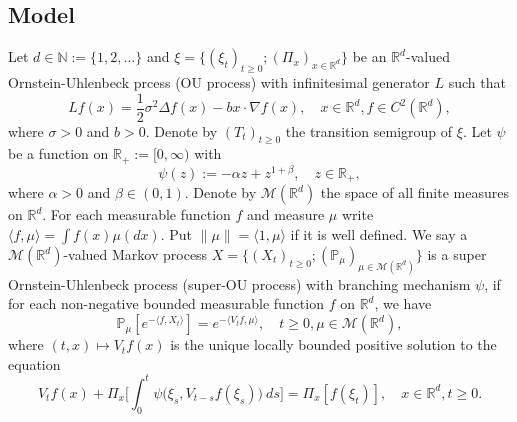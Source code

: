 \documentclass[12pt,oneside,english]{amsart}
\theoremstyle{plain}
\theoremstyle{definition}
\numberwithin{equation}{section}
\begin{document}
\subsection{Model}
    Let $d \in \mathbb N:= \{1,2,\dots\}$ and
    $\xi=\{(\xi_t)_{t\geq 0}; (\Pi_x)_{x\in \mathbb R^d}\}$ be an $\mathbb R^d$-valued Ornstein-Uhlenbeck prcess (OU process) with infinitesimal generator $L$ such that
\begin{equation}
\label{eq: OU generator}
    Lf(x)
        = \frac{1}{2}\sigma^2\Delta f(x)-b x \cdot \nabla f(x),
        \quad  x\in \mathbb R^d,
        f \in C^2(\mathbb{R}^d),
\end{equation}
    where $\sigma>0$ and $b>0$.
    Denote by $(T_t)_{t\geq 0}$ the transition semigroup of $\xi$.
    Let $\psi$ be a function on $\mathbb R_+:= [0,\infty)$ with
\begin{equation}\label{mechanism}
    \psi(z)
    := - \alpha z + z^{1+\beta},
    \quad z \in \mathbb R_+,
\end{equation}
	where $\alpha > 0$ and $\beta \in (0,1) $.
    Denote by $\mathcal{M}(\mathbb{R}^d)$ the space of all finite measures on $\mathbb{R}^d$.
    For each measurable function $f$ and measure $\mu$ write $\langle f,\mu\rangle = \int f(x)\mu(dx)$.
    Put $\|\mu\|=\langle 1,\mu\rangle$ if it is well defined.
    We say a $\mathcal{M}(\mathbb{R}^d)$-valued Markov process $X = \{(X_t)_{t\geq 0}; (\mathbb{P}_{\mu})_{\mu \in \mathcal M(\mathbb R^d)}\}$ is a super Ornstein-Uhlenbeck process (super-OU process) with branching mechanism $\psi$, if for each non-negative bounded measurable function $f$ on $\mathbb{R}^d$, we have
\begin{equation} \label{super}
    \mathbb{P}_{\mu}[e^{-\langle f,X_t \rangle}]
    = e^{-\langle V_tf, \mu \rangle},
    \quad t\geq 0, \mu \in \mathcal M(\mathbb R^d),
\end{equation}
	where $(t,x) \mapsto V_tf(x)$ is the unique locally bounded positive solution to the equation
\begin{equation}\label{eq1}
	V_tf(x) + \Pi_x \Big[ \int_0^t\psi\big(\xi_s,V_{t-s}f(\xi_s)\big)~ds\Big]
	= \Pi_x [f(\xi_t)],
    \quad x\in \mathbb R^d, t\geq 0.
\end{equation}	
\end{document}
